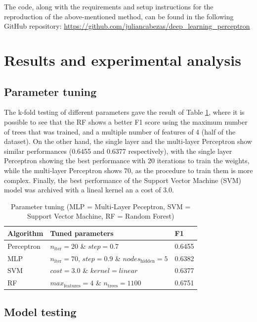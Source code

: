 \documentclass[10pt,twocolumn,letterpaper]{article}
\begin{document}
The code, along with the requirements and setup instructions for the reproduction of the above-mentioned method, can be found in the following GitHub repository: \url{https://github.com/juliancabezas/deep_learning_perceptron} 

\section{Results and experimental analysis}

\subsection{Parameter tuning}

The k-fold testing of different parameters gave the result of Table \ref{table:tuning}, where it is possible to see that the RF shows a better F1 score using the maximum number of trees that was trained, and a multiple number of features of 4 (half of the dataset). On the other hand, the single layer and the multi-layer Perceptron show similar performances (0.6455 and 0.6377 respectively), with the single layer Perceptron showing the best performance with 20 iterations to train the weights, while the multi-layer Perceptron shows 70, as the procedure to train them is more complex. Finally, the best performance of the Support Vector Machine (SVM) model was archived with a lineal kernel an a cost of 3.0.

\begin{table}[h]
	\begin{center}
		\begin{tabular}{|p{1.6cm}|p{4.3cm}|p{1cm}|}
			\hline
			Algorithm & Tuned parameters & F1 \\
			\hline\hline
			Perceptron & $n_\mathrm{iter} = 20$ \& $step = 0.7$ & 0.6455 \\
			MLP & $n_\mathrm{iter} = 70$, $step = 0.9$ \& $nodes_\mathrm{hidden} = 5$ & 0.6382 \\
			SVM & $cost = 3.0$ \& $kernel = linear$ & 0.6377 \\
			RF & $max_\mathrm{features} = 4$ \& $n_\mathrm{trees} = 1100$ & 0.6751 \\
			\hline
		\end{tabular}
	\end{center}
	\caption{Parameter tuning (MLP = Multi-Layer Peceptron, SVM = Support Vector Machine, RF = Random Forest)}
	\label{table:tuning}
\end{table}


\subsection{Model testing}
\end{document}

